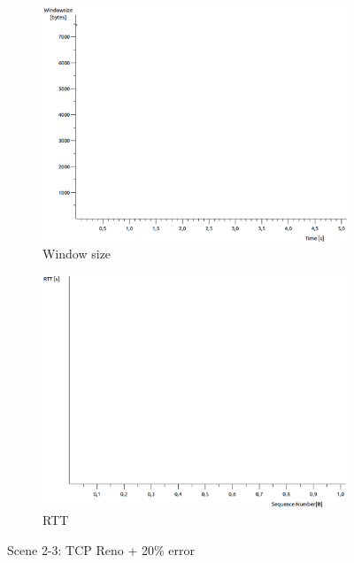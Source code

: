 \documentclass[conference,a4paper]{../../sty/IEEEtran}
\begin{document}
\begin{figure}
\begin{subfigure}[b]{0.2\textwidth}
  \includegraphics[width=\textwidth]{s2-3_wnd}
  \caption{Window size}
 \end{subfigure}
 \begin{subfigure}[b]{0.2\textwidth}
  \includegraphics[width=\textwidth]{s2-3_rtt}
  \caption{RTT}
 \end{subfigure}
 \caption{Scene 2-3: TCP Reno + 20\% error}
\end{figure}
\end{document}
